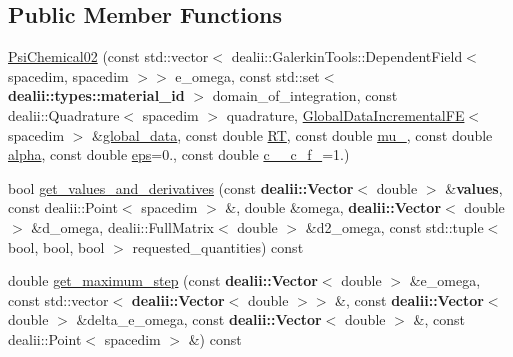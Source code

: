 \subsection*{Public Member Functions}
\begin{DoxyCompactItemize}
\item 
\hyperlink{classincremental_f_e_1_1_psi_chemical02_a82b105addb1311b165edfcdfbd4d0699}{Psi\+Chemical02} (const std\+::vector$<$ dealii\+::\+Galerkin\+Tools\+::\+Dependent\+Field$<$ spacedim, spacedim $>$$>$ e\+\_\+omega, const std\+::set$<$ {\bf dealii\+::types\+::material\+\_\+id} $>$ domain\+\_\+of\+\_\+integration, const dealii\+::\+Quadrature$<$ spacedim $>$ quadrature, \hyperlink{classincremental_f_e_1_1_global_data_incremental_f_e}{Global\+Data\+Incremental\+FE}$<$ spacedim $>$ \&\hyperlink{classincremental_f_e_1_1_psi_3_01spacedim_00_01spacedim_01_4_abf0a4804877fd7cc9bd1b90e52760ba9}{global\+\_\+data}, const double \hyperlink{classincremental_f_e_1_1_psi_chemical02_a4b93e968af97d8497a53be13980ef22e}{RT}, const double \hyperlink{classincremental_f_e_1_1_psi_chemical02_a70426dc3fa6acda53984c2e178ad92c5}{mu\+\_}, const double \hyperlink{classincremental_f_e_1_1_psi_3_01spacedim_00_01spacedim_01_4_af7b8227188dbdd6ada35b9445d96c79d}{alpha}, const double \hyperlink{classincremental_f_e_1_1_psi_chemical02_a1062004f111d9b425c16e3e3c1c4ce20}{eps}=0., const double \hyperlink{classincremental_f_e_1_1_psi_chemical02_aa2b9c1f2f65985cd003d9e33a5e54875}{c\+\_\+\_\+c\+\_\+f\+\_}=1.)
\item 
bool \hyperlink{classincremental_f_e_1_1_psi_chemical02_ab45494dcca7ee5787ae1ea11fab44d18}{get\+\_\+values\+\_\+and\+\_\+derivatives} (const {\bf dealii\+::\+Vector}$<$ double $>$ \&{\bf values}, const dealii\+::\+Point$<$ spacedim $>$ \&, double \&omega, {\bf dealii\+::\+Vector}$<$ double $>$ \&d\+\_\+omega, dealii\+::\+Full\+Matrix$<$ double $>$ \&d2\+\_\+omega, const std\+::tuple$<$ bool, bool, bool $>$ requested\+\_\+quantities) const 
\item 
double \hyperlink{classincremental_f_e_1_1_psi_chemical02_a5738025aba5fcadb4d3ffcb0cea103dd}{get\+\_\+maximum\+\_\+step} (const {\bf dealii\+::\+Vector}$<$ double $>$ \&e\+\_\+omega, const std\+::vector$<$ {\bf dealii\+::\+Vector}$<$ double $>$$>$ \&, const {\bf dealii\+::\+Vector}$<$ double $>$ \&delta\+\_\+e\+\_\+omega, const {\bf dealii\+::\+Vector}$<$ double $>$ \&, const dealii\+::\+Point$<$ spacedim $>$ \&) const 
\end{DoxyCompactItemize}
